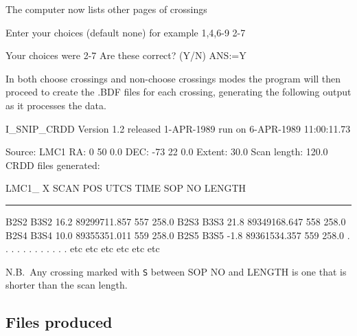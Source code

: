 \documentclass[nolof,noabs,11pt]{starlink}
\begin{document}
The computer now lists other pages of crossings

\begin{terminalv}
    Enter your choices (default none) for example 1,4,6-9
    2-7

    Your choices were 2-7
    Are these correct? (Y/N)
    ANS:=Y
\end{terminalv}
In both choose crossings and non-choose crossings modes the program will then
proceed to create the .BDF files for each crossing, generating the following
output as it processes the data.

\pagebreak
\begin{terminalv}
               I_SNIP_CRDD Version 1.2 released  1-APR-1989
             run on  6-APR-1989    11:00:11.73

      Source:       LMC1
      RA:            0 50  0.0
      DEC:         -73 22  0.0
      Extent:        30.0
      Scan length:  120.0
      CRDD files generated:

        LMC1_         X SCAN POS      UTCS TIME    SOP NO     LENGTH
\end{terminalv}
\hrule
\begin{terminalv}
       B2S2  B3S2        16.2      89299711.857     557        258.0
       B2S3  B3S3        21.8      89349168.647     558        258.0
       B2S4  B3S4        10.0      89355351.011     559        258.0
       B2S5  B3S5        -1.8      89361534.357     559        258.0
         .     .           .              .           .           .
         .     .           .              .           .           .
        etc   etc         etc            etc         etc         etc
\end{terminalv}

N.B.\ Any crossing marked with \texttt{S} between SOP NO and LENGTH is one that
is shorter than the scan length.

\subsection {Files produced}
\end{document}

